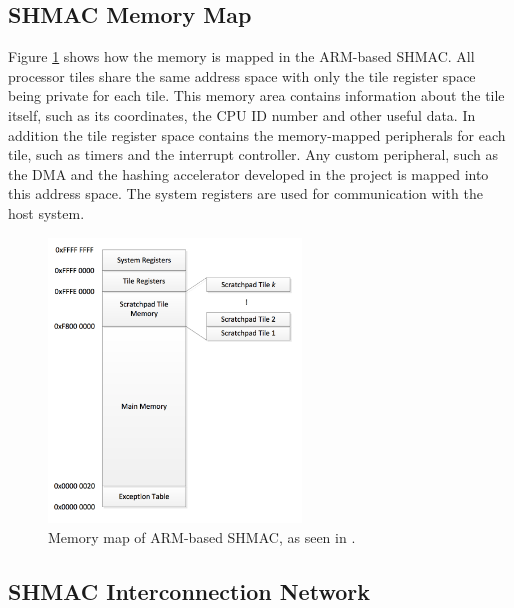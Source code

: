 \subsection{SHMAC Memory Map}

Figure \ref{fig:shmac-memory} shows how the memory is mapped in the ARM-based SHMAC. All
processor tiles share the same address space with only the tile register space being
private for each tile. This memory area contains information about the tile itself, such as its coordinates,
the CPU ID number and other useful data. In addition the tile register space contains the memory-mapped
peripherals for each tile, such as timers and the interrupt controller.
Any custom peripheral, such as the DMA and the hashing accelerator developed in the project is mapped into this address space.
The system registers are used for communication with the host system.

\begin{figure}[htb]
    \centering
    \includegraphics[width=0.6\textwidth]{Figures/Heterogeneous/SHMACMemory}
    \caption{Memory map of ARM-based SHMAC, as seen in \cite{shmac-plan}.}
    \label{fig:shmac-memory}
\end{figure}

\subsection{SHMAC Interconnection Network}

